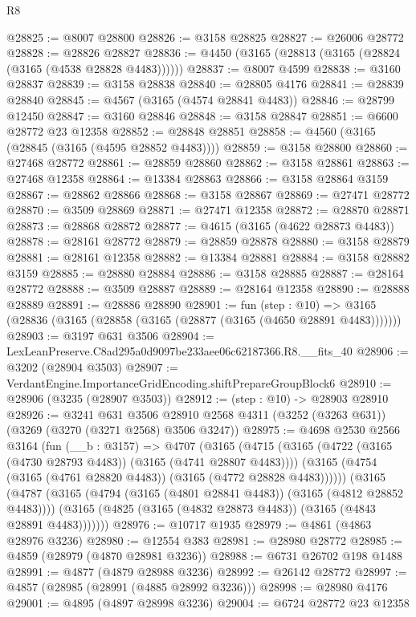 \begin{lexlean}{R8}
\begin{coremodule}
@28825 := @8007 @28800
@28826 := @3158 @28825
@28827 := @26006 @28772
@28828 := @28826 @28827
@28836 := @4450 (@3165 (@28813 (@3165 (@28824 (@3165 (@4538 @28828 @4483))))))
@28837 := @8007 @4599
@28838 := @3160 @28837
@28839 := @3158 @28838
@28840 := @28805 @4176
@28841 := @28839 @28840
@28845 := @4567 (@3165 (@4574 @28841 @4483))
@28846 := @28799 @12450
@28847 := @3160 @28846
@28848 := @3158 @28847
@28851 := @6600 @28772 @23 @12358
@28852 := @28848 @28851
@28858 := @4560 (@3165 (@28845 (@3165 (@4595 @28852 @4483))))
@28859 := @3158 @28800
@28860 := @27468 @28772
@28861 := @28859 @28860
@28862 := @3158 @28861
@28863 := @27468 @12358
@28864 := @13384 @28863
@28866 := @3158 @28864 @3159
@28867 := @28862 @28866
@28868 := @3158 @28867
@28869 := @27471 @28772
@28870 := @3509 @28869
@28871 := @27471 @12358
@28872 := @28870 @28871
@28873 := @28868 @28872
@28877 := @4615 (@3165 (@4622 @28873 @4483))
@28878 := @28161 @28772
@28879 := @28859 @28878
@28880 := @3158 @28879
@28881 := @28161 @12358
@28882 := @13384 @28881
@28884 := @3158 @28882 @3159
@28885 := @28880 @28884
@28886 := @3158 @28885
@28887 := @28164 @28772
@28888 := @3509 @28887
@28889 := @28164 @12358
@28890 := @28888 @28889
@28891 := @28886 @28890
@28901 := fun (step : @10) =>
  @3165 (@28836 (@3165 (@28858 (@3165 (@28877 (@3165 (@4650 @28891 @4483)))))))
@28903 := @3197 @631 @3506
@28904 := LexLeanPreserve.C8ad295a0d9097be233aee06c62187366.R8.__fits_40
@28906 := @3202 (@28904 @3503)
@28907 := VerdantEngine.ImportanceGridEncoding.shiftPrepareGroupBlock6
@28910 := @28906 (@3235 (@28907 @3503))
@28912 := (step : @10) -> @28903 @28910
@28926 := @3241
    @631
    @3506
    @28910
    @2568
    @4311
    (@3252 (@3263 @631))
    (@3269 (@3270 (@3271 @2568) @3506 @3247))
@28975 := @4698
    @2530
    @2566
    @3164
    (fun (__b : @3157) =>
    @4707
      (@3165
        (@4715
          (@3165 (@4722 (@3165 (@4730 @28793 @4483)) (@3165 (@4741 @28807 @4483))))
          (@3165 (@4754 (@3165 (@4761 @28820 @4483)) (@3165 (@4772 @28828 @4483))))))
      (@3165
        (@4787
          (@3165 (@4794 (@3165 (@4801 @28841 @4483)) (@3165 (@4812 @28852 @4483))))
          (@3165 (@4825 (@3165 (@4832 @28873 @4483)) (@3165 (@4843 @28891 @4483)))))))
@28976 := @10717 @1935
@28979 := @4861 (@4863 @28976 @3236)
@28980 := @12554 @383
@28981 := @28980 @28772
@28985 := @4859 (@28979 (@4870 @28981 @3236))
@28988 := @6731 @26702 @198 @1488
@28991 := @4877 (@4879 @28988 @3236)
@28992 := @26142 @28772
@28997 := @4857 (@28985 (@28991 (@4885 @28992 @3236)))
@28998 := @28980 @4176
@29001 := @4895 (@4897 @28998 @3236)
@29004 := @6724 @28772 @23 @12358

\end{coremodule}
\end{lexlean}
